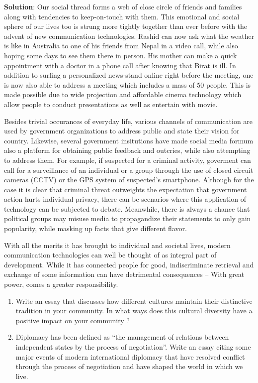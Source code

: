 \documentclass[
  openany]{book}
\newenvironment{solution}{ {\bfseries Solution}:}{}
\begin{document}
\begin{solution}
Our social thread forms a web of close circle of friends and families along with tendencies to keep-on-touch with them. This emotional and social sphere of our lives too is strung more tightly together than ever before with the advent of new communication technologies. Rashid can now ask what the weather is like in Australia to one of his friends from Nepal in a video call, while also hoping some days to see them there in person. His mother can make a quick appointment with a doctor in a phone call after knowing that Birat is ill. In addition to surfing a personalized news-stand online right before the meeting, one is now also able to address a meeting which includes a mass of 50 people. This is made possible due to wide projection and affordable cinema technology which allow people to conduct presentations as well as entertain with movie.

Besides trivial occurances of everyday life, various channels of communication are used by government organizations to address public and state their vision for country. Likewise, several government insitutions have made social media formum also a platform for obtaining public feedback and outcries, while also attempting to address them. For example, if suspected for a criminal activity, goverment can call for a surveillance of an individual or a group through the use of closed circuit cameras (CCTV) or the GPS system of suspected's smartphone. Although for the case it is clear that criminal threat outweights the expectation that government action hurts individual privacy, there can be scenarios where this application of technology can be subjected to debate. Meanwhile, there is always a chance that political groups may misuse media to propagandize their statements to only gain popularity, while masking up facts that give different flavor.

With all the merits it has brought to individual and societal lives, modern communication technologies can well be thought of as integral part of development. While it has connected people for good, indiscriminate retrieval and exchange of some information can have detrimental consequences -- With great power, comes a greater responsibility.

\end{solution}

\begin{enumerate}
\def\labelenumi{\arabic{enumi}.}
\setcounter{enumi}{1}
\item
  Write an essay that discusses how different cultures maintain their distinctive tradition in your community. In what ways does this cultural diversity have a positive impact on your community ?
\item
  Diplomacy has been defined as ``the management of relations between independent states by the process of negotiation''. Write an essay citing some major events of modern international diplomacy that have resolved conflict through the process of negotiation and have shaped the world in which we live.
\end{enumerate}
\end{document}
